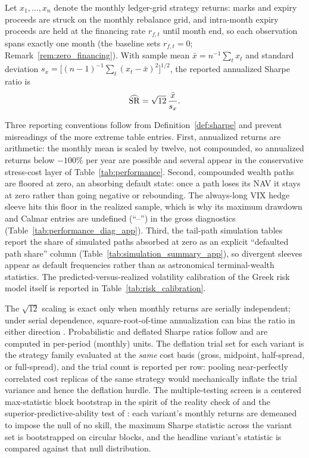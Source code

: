 \begin{definition}\label{def:sharpe}
Let \(x_1,\dots,x_n\) denote the monthly ledger-grid strategy returns: marks and expiry
proceeds are struck on the monthly rebalance grid, and intra-month expiry proceeds are held
at the financing rate \(r_{f,t}\) until month end, so each observation spans exactly one
month (the baseline sets \(r_{f,t}=0\); Remark~\ref{rem:zero_financing}). With sample mean
\(\bar x=n^{-1}\sum_{t}x_t\) and standard deviation
\(s_x=\bigl[(n-1)^{-1}\sum_{t}(x_t-\bar x)^2\bigr]^{1/2}\), the reported annualized Sharpe
ratio is
\[
  \widehat{\operatorname{SR}}=\sqrt{12}\,\frac{\bar x}{s_x}.
\]
\end{definition}

Three reporting conventions follow from Definition~\ref{def:sharpe} and prevent
misreadings of the more extreme table entries. First, annualized returns are arithmetic:
the monthly mean is scaled by twelve, not compounded, so annualized returns below
\(-100\%\) per year are possible and several appear in the conservative stress-cost layer
of Table~\ref{tab:performance}. Second, compounded wealth paths are floored at zero, an
absorbing default state: once a path loses its NAV it stays at zero rather than going
negative or rebounding. The always-long VIX hedge sleeve hits this floor in the realized
sample, which is why its maximum drawdown and Calmar entries are undefined (``--'') in the
gross diagnostics (Table~\ref{tab:performance_diag_app}). Third, the tail-path simulation
tables report the share of simulated paths absorbed at zero as an explicit
``defaulted path share'' column (Table~\ref{tab:simulation_summary_app}), so
divergent sleeves appear as default frequencies rather than as astronomical terminal-wealth
statistics. The predicted-versus-realized volatility calibration of the Greek risk model
itself is reported in Table~\ref{tab:risk_calibration}.

The \(\sqrt{12}\) scaling is exact only when monthly returns are serially independent;
under serial dependence, square-root-of-time annualization can bias the ratio in either
direction \citep{lo2002sharpe}. Probabilistic and deflated Sharpe ratios follow
\citet{bailey_lopezdeprado2014} and are computed in per-period (monthly) units. The
deflation trial set for each variant is the strategy family evaluated at the \emph{same}
cost basis (gross, midpoint, half-spread, or full-spread), and the trial count is reported
per row: pooling near-perfectly correlated cost replicas of the same strategy would
mechanically inflate the trial variance and hence the deflation hurdle. The multiple-testing screen is a
centered max-statistic block bootstrap in the spirit of the reality check of
\citet{white2000reality} and the superior-predictive-ability test of \citet{hansen2005spa}:
each variant's monthly returns are demeaned to impose the null of no skill, the maximum
Sharpe statistic across the variant set is bootstrapped on circular blocks, and the
headline variant's statistic is compared against that null distribution.


